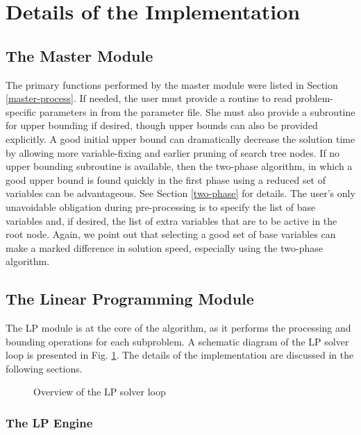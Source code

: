 \section{Details of the Implementation}
\label{modules}

\subsection{The Master Module}
\label{master}

The primary functions performed by the master module were listed in
Section \ref{master-process}. If needed, the user must provide a
routine to read problem-specific parameters in from the parameter
file. She must also provide a subroutine for upper bounding if
desired, though upper bounds can also be provided explicitly. A good
initial upper bound can dramatically decrease the solution time by
allowing more variable-fixing and earlier pruning of search tree
nodes. If no upper bounding subroutine is available, then the
two-phase algorithm, in which a good upper bound is found quickly in
the first phase using a reduced set of variables can be advantageous.
See Section \ref{two-phase} for details. The user's only unavoidable
obligation during pre-processing is to specify the list of base
variables and, if desired, the list of extra variables that are to be
active in the root node. Again, we point out that selecting a good set
of base variables can make a marked difference in solution speed,
especially using the two-phase algorithm.

\subsection{The Linear Programming  Module}

The LP module is at the core of the algorithm, as it performs the
processing and bounding operations for each subproblem. A schematic
diagram of the LP solver loop is presented in Fig. \ref{LP-loop}.
The details of the implementation are discussed in the following
sections. 

\begin{figure}
\centering
{}
\caption{Overview of the LP solver loop}
\label{LP-loop}
\end{figure}

\subsubsection{The LP Engine}

